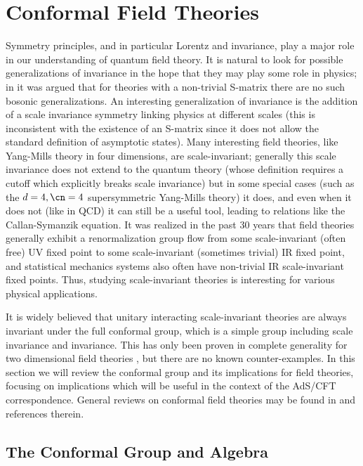
\section{Conformal Field Theories} 
\label{cft}

Symmetry principles, and in particular Lorentz and \Poincare
invariance, play a major role in our understanding of quantum field
theory. It is natural to look for possible generalizations of
\Poincare invariance in the hope that they may play some role in
physics; in \cite{Coleman:1967ad} 
it was argued that for theories with a non-trivial
S-matrix there are no such bosonic generalizations. An interesting
generalization of \Poincare invariance is the addition of a scale
invariance symmetry linking physics at different scales (this is
inconsistent with the existence of an S-matrix since it does not allow
the standard definition of asymptotic states). Many interesting field
theories, like Yang-Mills theory in four dimensions, are
scale-invariant; generally this scale invariance does not extend to
the quantum theory (whose definition requires a cutoff which
explicitly breaks scale invariance) but in some special cases (such as
the $d=4,\cn=4$ supersymmetric Yang-Mills theory) it does, and even
when it does not (like in QCD) it can still be a useful tool, leading
to relations like the Callan-Symanzik equation. It was realized in the
past 30 years that field theories generally exhibit a renormalization
group flow from some scale-invariant (often free) UV fixed point
to some scale-invariant (sometimes trivial) IR fixed point, and
statistical mechanics systems also often have non-trivial IR
scale-invariant fixed points. Thus, studying scale-invariant theories
is interesting for various physical applications.

It is widely believed that unitary interacting scale-invariant
theories are always invariant under the full conformal group, which is
a simple group including scale invariance and \Poincare
invariance. This has only been proven in complete generality for two
dimensional field theories
\cite{Zamolodchikov:1986gt,Polchinski:1988dy}, but there are no known
counter-examples. In this section we will review the conformal group
and its implications for field theories, focusing on implications
which will be useful in the context of the AdS/CFT
correspondence. General reviews on conformal field theories may be
found in \cite{Mack:1988nf,Fradkin:1996is,Fradkin:1997df} 
and references therein.

\subsection{The Conformal Group and Algebra}
\label{conformal_group}


